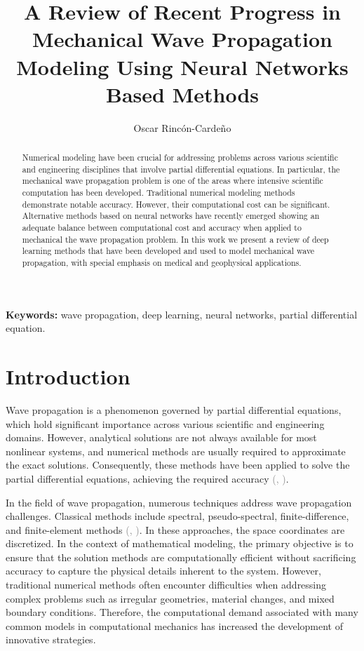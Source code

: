 \documentclass{tufte-handout}
\title[Modeling of Mechanical Wave Propagation]{A Review of Recent Progress in Mechanical Wave Propagation Modeling Using Neural Networks Based Methods}
\author[Oscar Rincón-Cardeño]{Oscar Rincón-Cardeño}
\providecommand{\keywords}[1]
{
  \small	
  \textbf{{Keywords:}} #1
}
\renewcommand{\citep}[2][]{\textcolor{gray}{(\citeauthor{#2}, \citeyear[#1]{#2})}}
\begin{document}
\maketitle

\begin{abstract}
\noindent
Numerical modeling have been crucial for addressing problems across various scientific and engineering disciplines that involve partial differential equations. In particular, the mechanical wave propagation problem is one of the areas where intensive scientific computation has been developed. Traditional numerical modeling methods demonstrate notable accuracy. However, their computational cost can be significant. Alternative methods based on neural networks have recently emerged showing an adequate balance between computational cost and accuracy when applied to mechanical the wave propagation problem. In this work we present a review of deep learning methods that have been developed and used to model mechanical wave propagation, with special emphasis on medical and geophysical applications.
\end{abstract}
\keywords{wave propagation, deep learning, neural networks, partial differential equation.}

\section{Introduction}

Wave propagation is a phenomenon governed by partial differential equations, which hold significant importance across various scientific and engineering domains. However, analytical solutions are not always available for most nonlinear systems, and numerical methods are usually required to approximate the exact solutions. Consequently, these methods have been applied to solve the partial differential equations, achieving the required accuracy \citep{Seriani2020}.

In the field of wave propagation, numerous techniques address wave propagation challenges. Classical methods include spectral, pseudo-spectral, finite-difference, and finite-element methods \citep{Moczo, virieux_review_2011, Igel2017}. In these approaches, the space coordinates are discretized. In the context of mathematical modeling, the primary objective is to ensure that the solution methods are computationally efficient without sacrificing accuracy to capture the physical details inherent to the system. However, traditional numerical methods often encounter difficulties when addressing complex problems such as irregular geometries, material changes, and mixed boundary conditions. Therefore, the computational demand associated with many common models in computational mechanics has increased the development of innovative strategies.
\end{document}

